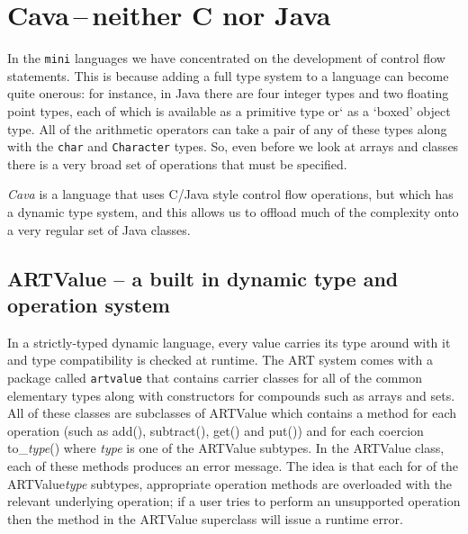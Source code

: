 \chapter{Cava\,--\,neither C nor Java}
In the {\tt mini} languages we have concentrated on the development of control flow statements. This is because adding a full type system to a language can become quite onerous: for instance, in Java there are four integer types and two floating point types, each of which is available as a primitive type or` as a `boxed' object type. All of the arithmetic operators can take a pair of any of these types along with the {\tt char} and {\tt Character} types. So, even before we look at arrays and classes there is a very broad set of operations that must be specified.

{\em Cava} is a language that uses C/Java style control flow operations, but which has a dynamic type system, and this allows us to offload much of the complexity onto a very regular set of Java classes.

\section{{\sf ARTValue} -- a built in dynamic type and operation system}
In a strictly-typed dynamic language, every value carries its type around with it and type compatibility is checked at runtime. The ART system comes with a package called {\tt artvalue} that contains carrier classes for all of the common elementary types along with constructors for compounds such as arrays and sets. All of these classes are subclasses of {\sf ARTValue} which contains a method for each operation (such as {\sf add(), subtract(), get()} and {\sf put()}) and for each coercion {\sf to\_{\em type}()} where {\sf\em type} is one of the {\sf ARTValue} subtypes. In the {\sf ARTValue} class, each of these methods produces an error message. The idea is that each for of the {\sf ARTValue{\em type}} subtypes, appropriate operation methods are overloaded with the relevant underlying operation; if a user tries to perform an unsupported operation then the method in the {\sf ARTValue} superclass will issue a runtime error.

